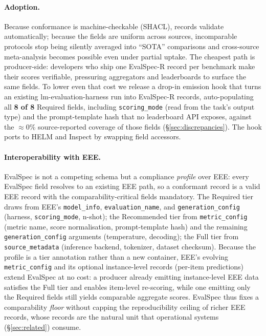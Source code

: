 \documentclass[11pt]{article}
\begin{document}
\paragraph{Adoption.}
Because conformance is machine-checkable (SHACL), records validate automatically;
because the fields are uniform across sources, incomparable protocols stop being
silently averaged into ``SOTA'' comparisons and cross-source meta-analysis becomes
possible even under partial uptake. The cheapest path is producer-side:
developers who ship one EvalSpec-R record per benchmark make their scores
verifiable, pressuring aggregators and leaderboards to surface the same fields. To
lower even that cost we release a drop-in emission hook that turns an existing
lm-evaluation-harness run into EvalSpec-R records, auto-populating all
\textbf{8 of 8} Required fields, including \texttt{scoring\_mode} (read from the
task's output type) and the prompt-template hash that no leaderboard API exposes,
against the $\approx$0\% source-reported coverage of those fields
(\S\ref{sec:discrepancies}). The hook ports to HELM and Inspect by swapping
field accessors.

\paragraph{Interoperability with EEE.} EvalSpec is not a competing schema but a
compliance \emph{profile} over EEE: every EvalSpec field resolves to an existing
EEE path, so a conformant record is a valid EEE record with the
comparability-critical fields mandatory. The Required tier draws from EEE's
\texttt{model\_info}, \texttt{evaluation\_name}, and \texttt{generation\_config}
(harness, \texttt{scoring\_mode}, n-shot); the Recommended tier from
\texttt{metric\_config} (metric name, score normalisation, prompt-template hash)
and the remaining \texttt{generation\_config} arguments (temperature, decoding);
the Full tier from \texttt{source\_metadata} (inference backend, tokenizer, dataset
checksum). Because the profile is a tier annotation rather than a new container,
EEE's evolving \texttt{metric\_config} and its optional instance-level records
(per-item predictions) extend EvalSpec at no cost: a producer already emitting
instance-level EEE data satisfies the Full tier and enables item-level re-scoring,
while one emitting only the Required fields still yields comparable aggregate
scores. EvalSpec thus fixes a comparability \emph{floor} without capping the
reproducibility ceiling of richer EEE records, whose records are the natural unit
that operational systems (\S\ref{sec:related}) consume.
\end{document}
